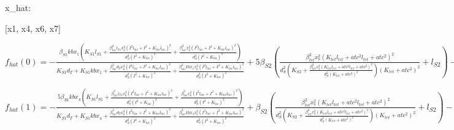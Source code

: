 x_{hat}: 

[x1, x4, x6, x7]


$f_{hat}(0)=- \frac{\beta_{S1} kb x_{1} \left(K_{S1} l_{S1} + \frac{\beta_{lac}^{2} l_{S1} x_{6}^{2} \left(I^{2} l_{lac} + I^{2} + K_{lac} l_{lac}\right)^{2}}{d_{S}^{2} \left(I^{2} + K_{lac}\right)^{2}} + \frac{\beta_{lac}^{2} x_{6}^{2} \left(I^{2} l_{lac} + I^{2} + K_{lac} l_{lac}\right)^{2}}{d_{S}^{2} \left(I^{2} + K_{lac}\right)^{2}}\right)}{K_{S1} d_{T} + K_{S1} kb x_{1} + \frac{\beta_{lac}^{2} d_{T} x_{6}^{2} \left(I^{2} l_{lac} + I^{2} + K_{lac} l_{lac}\right)^{2}}{d_{S}^{2} \left(I^{2} + K_{lac}\right)^{2}} + \frac{\beta_{lac}^{2} kb x_{1} x_{6}^{2} \left(I^{2} l_{lac} + I^{2} + K_{lac} l_{lac}\right)^{2}}{d_{S}^{2} \left(I^{2} + K_{lac}\right)^{2}}} + 5 \beta_{S2} \left(\frac{\beta_{tet}^{2} x_{7}^{2} \left(K_{tet} l_{tet} + atc^{2} l_{tet} + atc^{2}\right)^{2}}{d_{S}^{2} \left(K_{S2} + \frac{\beta_{tet}^{2} x_{7}^{2} \left(K_{tet} l_{tet} + atc^{2} l_{tet} + atc^{2}\right)^{2}}{d_{S}^{2} \left(K_{tet} + atc^{2}\right)^{2}}\right) \left(K_{tet} + atc^{2}\right)^{2}} + l_{S2}\right) - d_{T} x_{1}$


$f_{hat}(1)=- \frac{5 \beta_{S1} kb x_{4} \left(K_{S1} l_{S1} + \frac{\beta_{lac}^{2} l_{S1} x_{6}^{2} \left(I^{2} l_{lac} + I^{2} + K_{lac} l_{lac}\right)^{2}}{d_{S}^{2} \left(I^{2} + K_{lac}\right)^{2}} + \frac{\beta_{lac}^{2} x_{6}^{2} \left(I^{2} l_{lac} + I^{2} + K_{lac} l_{lac}\right)^{2}}{d_{S}^{2} \left(I^{2} + K_{lac}\right)^{2}}\right)}{K_{S1} d_{T} + K_{S1} kb x_{4} + \frac{\beta_{lac}^{2} d_{T} x_{6}^{2} \left(I^{2} l_{lac} + I^{2} + K_{lac} l_{lac}\right)^{2}}{d_{S}^{2} \left(I^{2} + K_{lac}\right)^{2}} + \frac{\beta_{lac}^{2} kb x_{4} x_{6}^{2} \left(I^{2} l_{lac} + I^{2} + K_{lac} l_{lac}\right)^{2}}{d_{S}^{2} \left(I^{2} + K_{lac}\right)^{2}}} + \beta_{S2} \left(\frac{\beta_{tet}^{2} x_{7}^{2} \left(K_{tet} l_{tet} + atc^{2} l_{tet} + atc^{2}\right)^{2}}{d_{S}^{2} \left(K_{S2} + \frac{\beta_{tet}^{2} x_{7}^{2} \left(K_{tet} l_{tet} + atc^{2} l_{tet} + atc^{2}\right)^{2}}{d_{S}^{2} \left(K_{tet} + atc^{2}\right)^{2}}\right) \left(K_{tet} + atc^{2}\right)^{2}} + l_{S2}\right) - d_{T} x_{4}$


